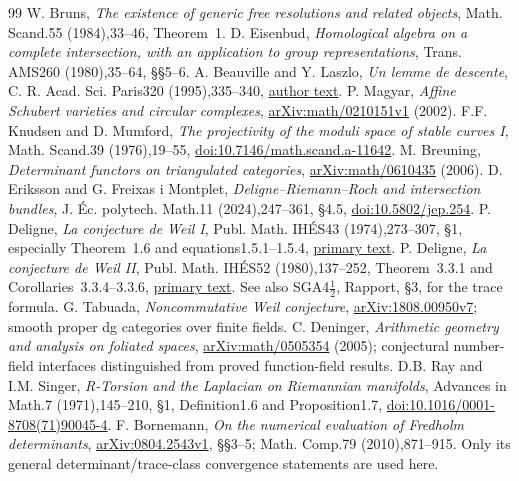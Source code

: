 \begin{thebibliography}{99}
 W. Bruns, \emph{The existence of generic free resolutions and related objects}, Math. Scand.55 (1984),33--46, Theorem~1.
 D. Eisenbud, \emph{Homological algebra on a complete intersection, with an application to group representations}, Trans. AMS260 (1980),35--64, \S\S5--6.
 A. Beauville and Y. Laszlo, \emph{Un lemme de descente}, C. R. Acad. Sci. Paris320 (1995),335--340, \href{https://math.univ-cotedazur.fr/~beauvill/pubs/descente.pdf}{author text}.
 P. Magyar, \emph{Affine Schubert varieties and circular complexes}, \href{https://arxiv.org/abs/math/0210151v1}{arXiv:math/0210151v1} (2002).
 F.F. Knudsen and D. Mumford, \emph{The projectivity of the moduli space of stable curves I}, Math. Scand.39 (1976),19--55, \href{https://doi.org/10.7146/math.scand.a-11642}{doi:10.7146/math.scand.a-11642}.
 M. Breuning, \emph{Determinant functors on triangulated categories}, \href{https://arxiv.org/abs/math/0610435}{arXiv:math/0610435} (2006).
 D. Eriksson and G. Freixas i Montplet, \emph{Deligne--Riemann--Roch and intersection bundles}, J. \'Ec. polytech. Math.11 (2024),247--361, \S4.5, \href{https://doi.org/10.5802/jep.254}{doi:10.5802/jep.254}.
 P. Deligne, \emph{La conjecture de Weil I}, Publ. Math. IH\'ES43 (1974),273--307, \S1, especially Theorem~1.6 and equations1.5.1--1.5.4, \href{https://www.numdam.org/item/PMIHES_1974__43__273_0.pdf}{primary text}.
 P. Deligne, \emph{La conjecture de Weil II}, Publ. Math. IH\'ES52 (1980),137--252, Theorem~3.3.1 and Corollaries~3.3.4--3.3.6, \href{https://numdam.org/articles/10.1007/BF02684780/}{primary text}. See also SGA4\ensuremath{\frac12}, Rapport, \S3, for the trace formula.
 G. Tabuada, \emph{Noncommutative Weil conjecture}, \href{https://arxiv.org/abs/1808.00950v7}{arXiv:1808.00950v7}; smooth proper dg categories over finite fields.
 C. Deninger, \emph{Arithmetic geometry and analysis on foliated spaces}, \href{https://arxiv.org/abs/math/0505354}{arXiv:math/0505354} (2005); conjectural number-field interfaces distinguished from proved function-field results.
 D.B. Ray and I.M. Singer, \emph{R-Torsion and the Laplacian on Riemannian manifolds}, Advances in Math.7 (1971),145--210, \S1, Definition1.6 and Proposition1.7, \href{https://doi.org/10.1016/0001-8708(71)90045-4}{doi:10.1016/0001-8708(71)90045-4}.
 F. Bornemann, \emph{On the numerical evaluation of Fredholm determinants}, \href{https://arxiv.org/abs/0804.2543v1}{arXiv:0804.2543v1}, \S\S3--5; Math. Comp.79 (2010),871--915. Only its general determinant/trace-class convergence statements are used here.
\end{thebibliography}

